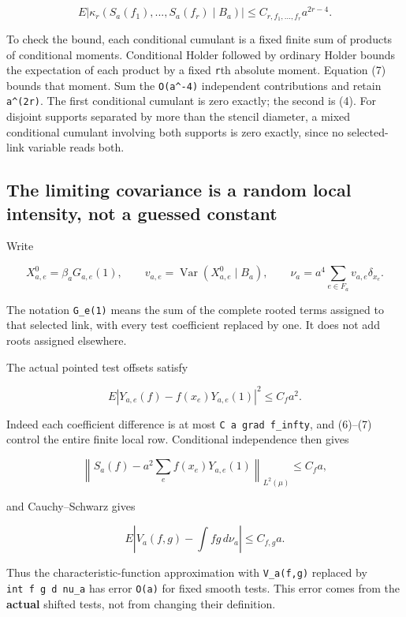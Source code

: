 \documentclass[
  11pt,
]{article}
\begin{document}
\[
 E\left|\kappa_r(S_a(f_1),...,S_a(f_r)\mid B_a)\right|
 \le C_{r,f_1,...,f_r}a^{2r-4}.
 \tag{12}
\]

To check the bound, each conditional cumulant is a fixed finite sum of
products of conditional moments. Conditional Holder followed by ordinary
Holder bounds the expectation of each product by a fixed \texttt{r}th
absolute moment. Equation (7) bounds that moment. Sum the
\texttt{O(a\^{}-4)} independent contributions and retain
\texttt{a\^{}(2r)}. The first conditional cumulant is zero exactly; the
second is (4). For disjoint supports separated by more than the stencil
diameter, a mixed conditional cumulant involving both supports is zero
exactly, since no selected-link variable reads both.

\hypertarget{the-limiting-covariance-is-a-random-local-intensity-not-a-guessed-constant}{%
\subsection{The limiting covariance is a random local intensity, not a
guessed
constant}\label{the-limiting-covariance-is-a-random-local-intensity-not-a-guessed-constant}}

Write

\[
 X_{a,e}^0=\beta_aG_{a,e}(1),\qquad
 v_{a,e}=\operatorname{Var}(X_{a,e}^0\mid B_a),
 \qquad \nu_a=a^4\sum_{e\in F_a}v_{a,e}\delta_{x_e}.
 \tag{13}
\]

The notation \texttt{G\_e(1)} means the sum of the complete rooted terms
assigned to that selected link, with every test coefficient replaced by
one. It does not add roots assigned elsewhere.

The actual pointed test offsets satisfy

\[
 E|Y_{a,e}(f)-f(x_e)Y_{a,e}(1)|^2
 \le C_fa^2.
 \tag{14}
\]

Indeed each coefficient difference is at most
\texttt{C\ a\ \textbar{}\textbar{}grad\ f\textbar{}\textbar{}\_infty},
and (6)--(7) control the entire finite local row. Conditional
independence then gives

\[
 \left\|S_a(f)-a^2\sum_ef(x_e)Y_{a,e}(1)\right\|_{L^2(\mu)}
 \le C_fa,
 \tag{15}
\]

and Cauchy--Schwarz gives

\[
 E\left|V_a(f,g)-\int fg\,d\nu_a\right|\le C_{f,g}a.
 \tag{16}
\]

Thus the characteristic-function approximation with \texttt{V\_a(f,g)}
replaced by \texttt{int\ f\ g\ d\ nu\_a} has error \texttt{O(a)} for
fixed smooth tests. This error comes from the \textbf{actual} shifted
tests, not from changing their definition.
\end{document}
